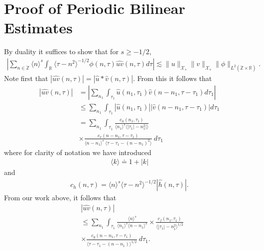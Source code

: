 \documentclass[12pt,reqno]{amsart}
\numberwithin{equation}{section}  %
\newcommand{\rr}{\mathbb{R}}
\newcommand{\zz}{\mathbb{Z}}
\newcommand{\zzdot}{\dot{\zz}}
\newcommand{\wh}{\widehat}
\begin{document}
\section{Proof of Periodic Bilinear Estimates} 
\label{sec:proof-bilin-est}
By duality it suffices to show that for $s \ge -1/2$, 
\begin{equation}
\label{duality-est}
\begin{split}
|	\sum_{n \in \zzdot}  \langle n \rangle^{s}
\int_{\rr} \langle \tau - n^{2}  \rangle ^{-1/2}\phi(n, \tau) \wh{uv}(n, \tau) d \tau | \lesssim \|u\|_{\mathcal{X}_{s}}
\|v\|_{\mathcal{X}_{s}}
\|\phi \|_{L^{2}(\zzdot \times \rr)}.
\end{split}
\end{equation}
Note first that $|\wh{uv}(n, \tau) |  = | \wh{u} *  \wh{v} 
(n, \tau)|$. From this it follows that
\begin{equation}
\label{non-lin-rep}
\begin{split}
| \wh{uv}(n, \tau)|
& = | \sum_{n_{1}}  \int_{\tau_{1}}
\wh{u}\left( n_1,  \tau_1 \right) \wh{v}\left( n - n_1 , \tau - \tau_1   
\right) d \tau_1 |
\\
& \le  \sum_{n_{1}}  \int_{\tau_{1}}
|\wh{u}\left( n_1,  \tau_1 \right)| |\wh{v}\left( n - n_1 , \tau - \tau_1   
\right)| d \tau_1 
\\
& = \sum_{n_{1}} \int_{\tau_{1}} \frac{c_u\left( n_1, \tau_1 
\right)}{\langle n_1 \rangle ^s \langle |\tau_1| - n_1^{2} | \rangle }
\\
& \times \frac{c_{v}\left( n - n_1, \tau - \tau_1 \right)}{\langle n -
n_1 \rangle ^s\ \langle \tau - \tau_{1} -  (n - n_1)^{2} \rangle}
\ d \tau_1 
\end{split}
\end{equation}
where for clarity of notation we have introduced 
\begin{equation*}
\begin{split}
\langle k \rangle \doteq 1 + |k|
\end{split}
\end{equation*}
and
\begin{equation*}
\begin{split}
c_h(n, \tau) =
\langle n \rangle ^s \langle \tau - n^{2} \rangle^{-1/2} | \wh{h}\left( n, \tau \right) |.
\end{split}
\end{equation*}
From our work above, it follows that 
\begin{equation}
\label{convo-est-starting-pnt}
\begin{split}
&  | \wh{uv}\left( 
n, \tau \right) |
\\
& \le  
\sum_{n_{1}} \int_{\tau_{1}} \frac{\langle n \rangle^{s}}{\langle n_1 \rangle^s
\langle n - n_1 \rangle^s} 
\times \frac{c_f(n_1, \tau_1)}{\langle |\tau_1| - n_1^{2} \rangle^{1/2}}
\\
& \times
\frac{c_g(n - n_1, \tau - \tau_1 )}{\langle \tau - \tau_{1} - (n - n_1)
\rangle^{1/2}}\ d \tau_1.
\end{split}
\end{equation}
\end{document}
